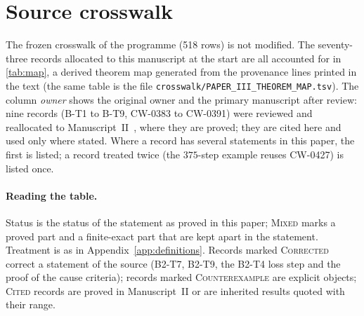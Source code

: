 \section{Source crosswalk}\label{app:crosswalk}
The frozen crosswalk of the programme (518 rows) is not modified. The seventy-three records allocated to this manuscript at the start are all accounted for in \cref{tab:map}, a derived theorem map generated from the provenance lines printed in the text (the same table is the file \texttt{crosswalk/PAPER\_III\_THEOREM\_MAP.tsv}). The column \emph{owner} shows the original owner and the primary manuscript after review: nine records (B-T1 to B-T9, CW-0383 to CW-0391) were reviewed and reallocated to Manuscript~II~\cite{PaperII}, where they are proved; they are cited here and used only where stated. Where a record has several statements in this paper, the first is listed; a record treated twice (the $375$-step example reuses CW-0427) is listed once.

\paragraph{Reading the table.} Status is the status of the statement as proved in this paper; \textsc{Mixed} marks a proved part and a finite-exact part that are kept apart in the statement. Treatment is as in Appendix~\ref{app:definitions}. Records marked \textsc{Corrected} correct a statement of the source (B2-T7, B2-T9, the B2-T4 loss step and the proof of the cause criteria); records marked \textsc{Counterexample} are explicit objects; \textsc{Cited} records are proved in Manuscript~II or are inherited results quoted with their range.

